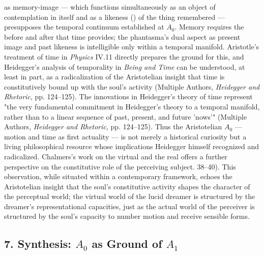 as memory-image --- which functions simultaneously as an object of contemplation in itself and as a likeness () of the thing remembered --- presupposes the temporal continuum established at $A_0$. Memory requires the before and after that time provides; the phantasma's dual aspect as present image and past likeness is intelligible only within a temporal manifold. Aristotle's treatment of time in \textit{Physics} IV.11 directly prepares the ground for this, and Heidegger's analysis of temporality in \textit{Being and Time} can be understood, at least in part, as a radicalization of the Aristotelian insight that time is constitutively bound up with the soul's activity (Multiple Authors, \textit{Heidegger and Rhetoric}, pp. 124--125). The innovations in Heidegger's theory of time represent "the very fundamental commitment in Heidegger's theory to a temporal manifold, rather than to a linear sequence of past, present, and future 'nows'" (Multiple Authors, \textit{Heidegger and Rhetoric}, pp. 124--125). Thus the Aristotelian $A_0$ --- motion and time as first actuality --- is not merely a historical curiosity but a living philosophical resource whose implications Heidegger himself recognized and radicalized. Chalmers's work on the virtual and the real offers a further perspective on the constitutive role of the perceiving subject. 38--40). This observation, while situated within a contemporary framework, echoes the Aristotelian insight that the soul's constitutive activity shapes the character of the perceptual world; the virtual world of the lucid dreamer is structured by the dreamer's representational capacities, just as the actual world of the perceiver is structured by the soul's capacity to number motion and receive sensible forms. 

\subsection*{7. Synthesis: $A_0$ as Ground of $A_1$}

